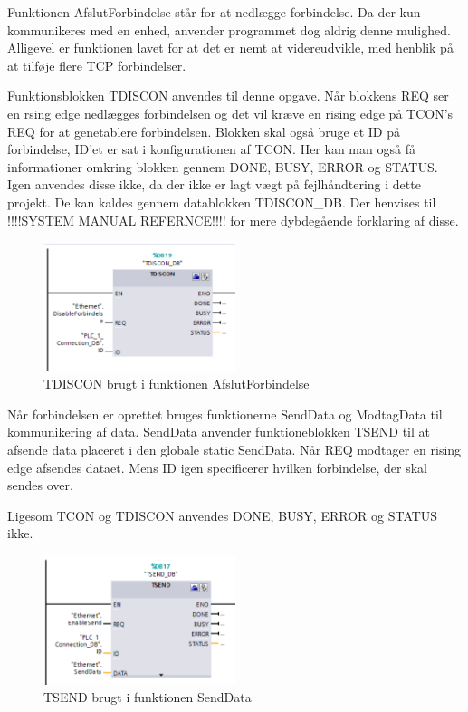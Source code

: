 Funktionen AfslutForbindelse står for at nedlægge forbindelse. Da der kun kommunikeres med en enhed, anvender programmet dog aldrig denne mulighed. Alligevel er funktionen lavet for at det er nemt at videreudvikle, med henblik på at tilføje flere TCP forbindelser. 

Funktionsblokken TDISCON anvendes til denne opgave. Når blokkens REQ ser en rsing edge nedlægges forbindelsen og det vil kræve en rising edge på TCON's REQ for at genetablere forbindelsen. Blokken skal også bruge et ID på forbindelse, ID'et er sat i konfigurationen af TCON. Her kan man også få informationer omkring blokken gennem DONE, BUSY, ERROR og STATUS. Igen anvendes disse ikke, da der ikke er lagt vægt på fejlhåndtering i dette projekt. De kan kaldes gennem datablokken TDISCON\_DB. Der henvises til !!!!SYSTEM MANUAL REFERNCE!!!! for mere dybdegående forklaring af disse.

\begin{figure}[H] %
	\centering
	\includegraphics[width=0.5\textwidth]{Figure/TDISCON}
	\caption{TDISCON brugt i funktionen AfslutForbindelse}
	\label{fig:TDISCON}
\end{figure}

Når forbindelsen er oprettet bruges funktionerne SendData og ModtagData til  kommunikering af data. SendData anvender funktioneblokken TSEND til at afsende data placeret i den globale static SendData. Når REQ modtager en rising edge afsendes dataet. Mens ID igen specificerer hvilken forbindelse, der skal sendes over.

Ligesom TCON og TDISCON anvendes DONE, BUSY, ERROR og STATUS ikke.

\begin{figure}[H] %
	\centering
	\includegraphics[width=0.5\textwidth]{Figure/TSEND}
	\caption{TSEND brugt i funktionen SendData}
	\label{fig:TSEND}
\end{figure}

